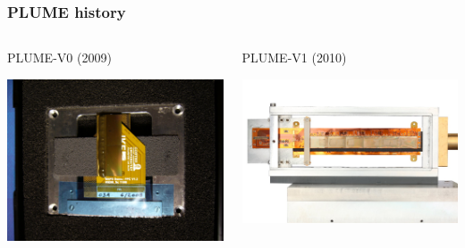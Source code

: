 \documentclass{beamer}
\begin{document}
  \begin{frame}[plain]
    \frametitle{PLUME history}

    \begin{columns}[t]
      \begin{column}{5cm}
        \centering
        PLUME-V0 (2009)

        \includegraphics[width = \textwidth]{Pictures/plume_ladder2009_1.jpg}
      \end{column}
      \begin{column}{5cm}
        \centering
        PLUME-V1 (2010)

        \includegraphics[width = \textwidth]{Pictures/plume_ladder2010_frontView.jpg}
      \end{column}
    \end{columns}

  \end{frame}
\end{document}
